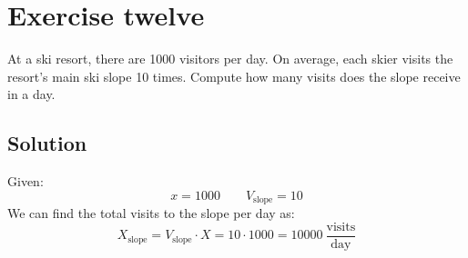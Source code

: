 \section{Exercise twelve}

At a ski resort, there are 1000 visitors per day. 
On average, each skier visits the resort's main ski slope 10 times. 
Compute how many visits does the slope receive in a day. 

\subsection*{Solution}
Given:
\[x=1000\qquad V_{\text{slope}}=10\]
We can find the total visits to the slope per day as:
\[X_{\text{slope}}=V_{\text{slope}}\cdot X=10 \cdot 1000=10000\:\dfrac{\text{visits}}{\text{day}}\]